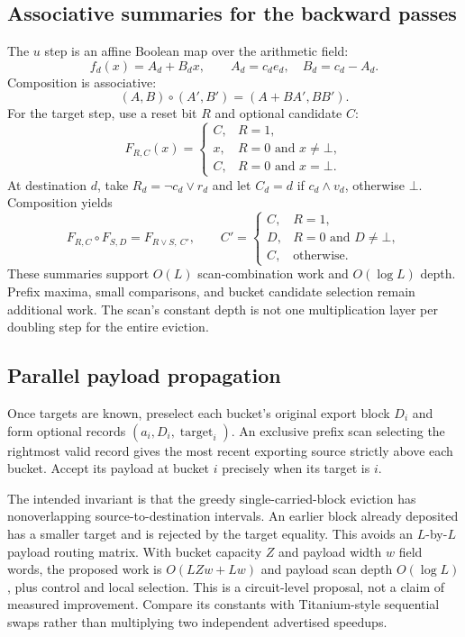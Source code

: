 \documentclass[11pt]{article}
\begin{document}
\subsection{Associative summaries for the backward passes}

The $u$ step is an affine Boolean map over the arithmetic field:
\[
f_d(x)=A_d+B_dx,\qquad A_d=c_de_d,\quad B_d=c_d-A_d.
\]
Composition is associative:
\[
(A,B)\circ(A',B')=(A+BA',BB').
\]
For the target step, use a reset bit $R$ and optional candidate $C$:
\[
F_{R,C}(x)=\begin{cases}
C,&R=1,\\
x,&R=0\text{ and }x\ne\bot,\\
C,&R=0\text{ and }x=\bot.
\end{cases}
\]
At destination $d$, take $R_d=\neg c_d\lor r_d$ and let $C_d=d$ if
$c_d\land v_d$, otherwise $\bot$. Composition yields
\[
F_{R,C}\circ F_{S,D}=F_{R\lor S,\ C'},\qquad
C'=\begin{cases}
C,&R=1,\\
D,&R=0\text{ and }D\ne\bot,\\
C,&\text{otherwise}.
\end{cases}
\]
These summaries support $O(L)$ scan-combination work and $O(\log L)$ depth.
Prefix maxima, small comparisons, and bucket candidate selection remain
additional work. The scan's constant depth is not one multiplication layer per
doubling step for the entire eviction.

\subsection{Parallel payload propagation}

Once targets are known, preselect each bucket's original export block $D_i$ and
form optional records $(a_i,D_i,\operatorname{target}_i)$. An exclusive prefix
scan selecting the rightmost valid record gives the most recent exporting source
strictly above each bucket. Accept its payload at bucket $i$ precisely when its
target is $i$.

The intended invariant is that the greedy single-carried-block eviction has
nonoverlapping source-to-destination intervals. An earlier block already deposited
has a smaller target and is rejected by the target equality. This avoids an
$L$-by-$L$ payload routing matrix. With bucket capacity $Z$ and payload width
$w$ field words, the proposed work is $O(LZw+Lw)$ and payload scan depth
$O(\log L)$, plus control and local selection. This is a circuit-level proposal,
not a claim of measured improvement. Compare its constants with Titanium-style
sequential swaps rather than multiplying two independent advertised speedups.
\end{document}
